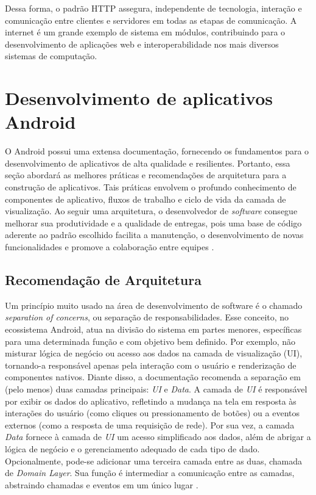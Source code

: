 Dessa forma, o padrão HTTP assegura, independente de tecnologia, interação e comunicação entre clientes e servidores em todas as 
etapas de comunicação. A internet é um grande exemplo de sistema em módulos, contribuindo para o desenvolvimento de aplicações web e 
interoperabilidade nos mais diversos sistemas de computação.

\section{Desenvolvimento de aplicativos Android}

O Android possui uma extensa documentação, fornecendo os fundamentos para o desenvolvimento de 
aplicativos de alta qualidade e resilientes. Portanto, essa seção abordará as melhores práticas e recomendações
de arquitetura para a construção de aplicativos. Tais práticas envolvem o profundo
conhecimento de componentes de aplicativo, fluxos de trabalho e ciclo de vida da camada de visualização. Ao seguir uma arquitetura, 
o desenvolvedor de \textit{software} consegue melhorar sua produtividade e a qualidade de entregas, pois uma base de código aderente ao 
padrão escolhido facilita a manutenção, o desenvolvimento de novas funcionalidades e promove a colaboração entre equipes \cite{google-developers-guideline}.

\subsection{Recomendação de Arquitetura}

Um princípio muito usado na área de desenvolvimento de software é o chamado \textit{separation of concerns}, ou separação de responsabilidades. Esse conceito, no ecossistema Android,
atua na divisão do sistema em partes menores, específicas para uma determinada função e com objetivo bem definido. Por exemplo, não misturar lógica de 
negócio ou acesso aos dados na camada de visualização (UI), tornando-a  responsável apenas pela interação com o usuário e renderização de componentes nativos. Diante disso, a documentação recomenda a separação em (pelo menos)
duas camadas principais: \textit{UI} e \textit{Data}. A camada de \textit{UI} é responsável por exibir os dados do aplicativo, refletindo a mudança na tela em resposta às
interações do usuário (como cliques ou pressionamento de botões) ou a eventos externos (como a resposta de uma requisição de rede). Por sua vez, a camada \textit{Data} fornece à camada de \textit{UI} 
um acesso simplificado aos dados, além de abrigar a lógica de negócio e o gerenciamento adequado de cada tipo de dado. Opcionalmente, pode-se adicionar uma terceira camada entre as duas, chamada de \textit{Domain Layer}.
Sua função é intermediar a comunicação entre as camadas, abstraindo chamadas e eventos em um único lugar \cite{google-developers-guideline}.

